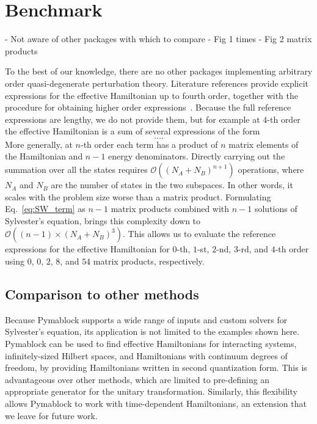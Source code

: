 \section{Benchmark}
\label{sec:benchmark}

- Not aware of other packages with which to compare
- Fig 1 times
- Fig 2 matrix products

To the best of our knowledge, there are no other packages implementing arbitrary order quasi-degenerate perturbation theory.
Literature references provide explicit expressions for the effective Hamiltonian up to fourth order, together with the procedure for obtaining higher order expressions~\cite{Winkler_2003}.
Because the full reference expressions are lengthy, we do not provide them, but for example at $4$-th order the effective Hamiltonian is a sum of several expressions of the form
\begin{equation}
\label{eq:SW_term}
\dots.
\end{equation}
More generally, at $n$-th order each term has a product of $n$ matrix elements of the Hamiltonian and $n-1$ energy denominators.
Directly carrying out the summation over all the states requires $\mathcal{O}((N_A + N_B)^{n+1})$ operations, where $N_A$ and $N_B$ are the number of states in the two subspaces.
In other words, it scales with the problem size worse than a matrix product.
Formulating Eq.~\eqref{eq:SW_term} as $n-1$ matrix products combined with $n-1$ solutions
of Sylvester's equation, brings this complexity down to $\mathcal{O}((n-1) \times (N_A + N_B)^3)$.
This allows us to evaluate the reference expressions for the effective Hamiltonian for
$0$-th, $1$-st, $2$-nd, $3$-rd, and $4$-th order using $0$, $0$, $2$, $8$, and $54$ matrix products, respectively.

\subsection{Comparison to other methods}

Because Pymablock supports a wide range of inputs and custom solvers for
Sylvester's equation, its application is not limited to the examples shown
here.
Pymablock can be used to find effective Hamiltonians for interacting systems,
infinitely-sized Hilbert spaces, and Hamiltonians with continuum degrees of
freedom, by providing Hamiltonians written in second quantization form.
This is advantageous over other methods, which are limited to pre-defining
an appropriate generator for the unitary transformation.
Similarly, this flexibility allows Pymablock to work with time-dependent
Hamiltonians, an extension that we leave for future work.


